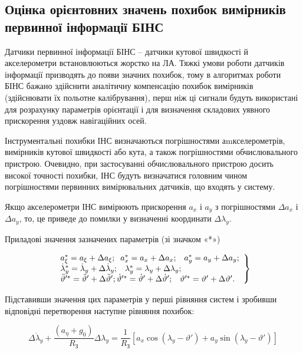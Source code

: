 \subsection{Оцінка орієнтовних значень похибок вимірників первинної інформації БІНС}

Датчики первинної інформації БІНС -- датчики кутової швидкості й акселерометри встановлюються жорстко на ЛА. 
Тяжкі умови роботи датчиків інформації призводять до появи значних похибок, тому в алгоритмах роботи БІНС бажано 
здійснити аналітичну компенсацію похибок вимірників (здійснювати їх польотне калібрування), перш ніж ці сигнали 
будуть використані для розрахунку параметрів орієнтації і для визначення складових уявного прискорення уздовж навігаційних осей.

Інструментальні похибки ІНС визначаються погрішностями аmкселерометрів, вимірників кутової швидкості або кута, 
а також погрішностями обчислювального пристрою. Очевидно, при застосуванні обчислювального пристрою досить високої 
точності похибки, ІНС будуть визначатися головним чином погрішностями первинних вимірювальних датчиків, що входять у систему.

Якщо акселерометри ІНС вимірюють прискорення $a_{x} $ і $a_{y} $ з погрішностями $\Delta a_{x} $ і $\Delta a_{y} $, то,  
це приведе до помилки у визначенні координати $\Delta \lambda _{y} $.

Приладові значення зазначених параметрів (зі значком «*»)

\begin{equation} 
\label{eq:err} 
\left. 
\begin{array}{l} 
{a_{\xi }^{*} =a_{\xi } +\Delta a_{\xi } ;{\rm \; \; }a_{x}^{*} =a_{x} +\Delta a_{x} ;{\rm \; \; \; }a_{y}^{*} =a_{y} +\Delta a_{y} ;} 
\\ {\dot{\lambda }_{y}^{*} =\dot{\lambda }_{y} +\Delta \dot{\lambda }_{y} ;{\rm \; \; \; }\lambda _{y}^{*} =\lambda _{y} 
+\Delta \lambda _{y} ;}
\\ {\ddot{\vartheta }'^{*} =\ddot{\vartheta }'+\Delta \ddot{\vartheta }'; \dot{\vartheta }'^{*} =\dot{\vartheta }'+\Delta \dot{\vartheta }';
{\rm \; \; \; }\vartheta '^{*} =\vartheta '+\Delta \vartheta '.} \end{array}\right\} 
\end{equation} 

Підставивши значення цих параметрів у перші рівняння систем і зробивши відповідні перетворення наступне рівняння похибок:

\begin{equation} 
\label{eq:lam_err} 
\Delta \ddot{\lambda }_{y} +\frac{(a_{\eta } +g_{0} )}{R_{{\text{З}}} } 
\Delta \lambda _{y} =\frac{1}{R_{{\text{З}}} } \left[a_{x} \cos (\lambda _{y} -\vartheta ')+a_{y} \sin (\lambda _{y} -
\vartheta ')\right] 
\end{equation} 

